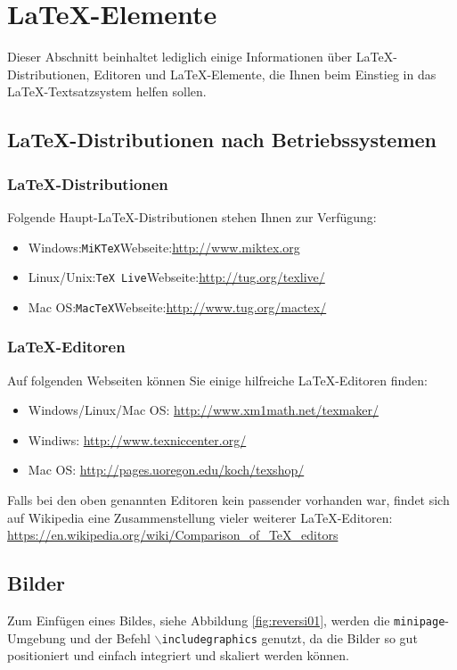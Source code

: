 \thispagestyle{empty}
\section{\LaTeX-Elemente}
Dieser Abschnitt beinhaltet lediglich einige Informationen über \LaTeX-Distributionen, Editoren und \LaTeX-Elemente, die Ihnen beim Einstieg in das \LaTeX-Textsatzsystem helfen sollen.

\subsection{\LaTeX-Distributionen nach Betriebssystemen}

\subsubsection{\LaTeX-Distributionen}
Folgende Haupt-\LaTeX-Distributionen stehen Ihnen zur Verfügung:
\begin{itemize}
  \item Windows:\quad \texttt{MiKTeX}\quad Webseite:\quad\url{http://www.miktex.org}
  \item Linux/Unix:\quad \texttt{TeX Live}\quad Webseite:\quad\url{http://tug.org/texlive/}
  \item Mac OS:\quad \texttt{MacTeX}\quad Webseite:\quad\url{http://www.tug.org/mactex/}
\end{itemize}

\subsubsection{\LaTeX-Editoren}
Auf folgenden Webseiten können Sie einige hilfreiche \LaTeX-Editoren finden:
\begin{itemize}
  \item Windows/Linux/Mac OS: \url{http://www.xm1math.net/texmaker/}
  \item Windiws: \url{http://www.texniccenter.org/}
  \item Mac OS: \url{http://pages.uoregon.edu/koch/texshop/}
\end{itemize}

Falls bei den oben genannten Editoren kein passender vorhanden war, findet sich auf Wikipedia eine Zusammenstellung vieler weiterer \LaTeX-Editoren:\\[1em]
\hspace*{3cm}\url{https://en.wikipedia.org/wiki/Comparison_of_TeX_editors}


\subsection{Bilder}
Zum Einfügen eines Bildes, siehe Abbildung \ref{fig:reversi01}, werden die \texttt{minipage}-Umgebung und der Befehl \texttt{$\backslash$includegraphics} genutzt, da die Bilder so gut positioniert und einfach integriert und skaliert werden können.

